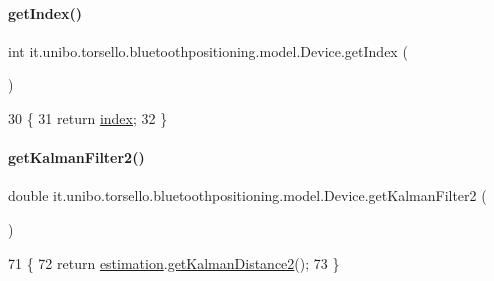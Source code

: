 \paragraph{\texorpdfstring{get\+Index()}{getIndex()}}
{\footnotesize\ttfamily int it.\+unibo.\+torsello.\+bluetoothpositioning.\+model.\+Device.\+get\+Index (\begin{DoxyParamCaption}{ }\end{DoxyParamCaption})}


\begin{DoxyCode}
30                           \{
31         \textcolor{keywordflow}{return} \hyperlink{classit_1_1unibo_1_1torsello_1_1bluetoothpositioning_1_1model_1_1Device_a55a01164b2388451f5e8344bfbc61ccc_a55a01164b2388451f5e8344bfbc61ccc}{index};
32     \}
\end{DoxyCode}
\hypertarget{classit_1_1unibo_1_1torsello_1_1bluetoothpositioning_1_1model_1_1Device_a2ea8bed4581606a64f048f3570d58324_a2ea8bed4581606a64f048f3570d58324}{}\label{classit_1_1unibo_1_1torsello_1_1bluetoothpositioning_1_1model_1_1Device_a2ea8bed4581606a64f048f3570d58324_a2ea8bed4581606a64f048f3570d58324} 
\paragraph{\texorpdfstring{get\+Kalman\+Filter2()}{getKalmanFilter2()}}
{\footnotesize\ttfamily double it.\+unibo.\+torsello.\+bluetoothpositioning.\+model.\+Device.\+get\+Kalman\+Filter2 (\begin{DoxyParamCaption}{ }\end{DoxyParamCaption})}


\begin{DoxyCode}
71                                      \{
72         \textcolor{keywordflow}{return} \hyperlink{classit_1_1unibo_1_1torsello_1_1bluetoothpositioning_1_1model_1_1Device_ac619c42728cd40f41a5f12fde56b4425_ac619c42728cd40f41a5f12fde56b4425}{estimation}.\hyperlink{classit_1_1unibo_1_1torsello_1_1bluetoothpositioning_1_1distanceEstimation_1_1Estimation_a4a4511ce7469879058de082403bd9847_a4a4511ce7469879058de082403bd9847}{getKalmanDistance2}();
73     \}
\end{DoxyCode}
\hypertarget{classit_1_1unibo_1_1torsello_1_1bluetoothpositioning_1_1model_1_1Device_aa86454f965d50f015f1f40abe2d0d19a_aa86454f965d50f015f1f40abe2d0d19a}{}\label{classit_1_1unibo_1_1torsello_1_1bluetoothpositioning_1_1model_1_1Device_aa86454f965d50f015f1f40abe2d0d19a_aa86454f965d50f015f1f40abe2d0d19a} 
